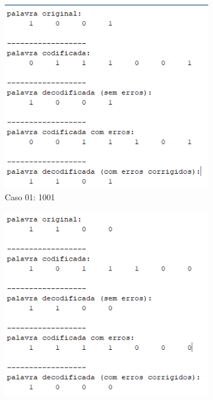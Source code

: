 \documentclass{article}
\begin{document}
\begin{figure}[htbp]
    \centering
    \begin{subfigure}[b]{0.22\textwidth}
        \includegraphics[width=\textwidth]{4bitsCaso01.png}
        \caption{Caso 01: 1001}
        \label{fig:imagem1}
    \end{subfigure}
    \hfill
    \begin{subfigure}[b]{0.22\textwidth}
        \includegraphics[width=\textwidth]{4bitsCaso02.png}

\end{subfigure}
\end{figure}
\end{document}
